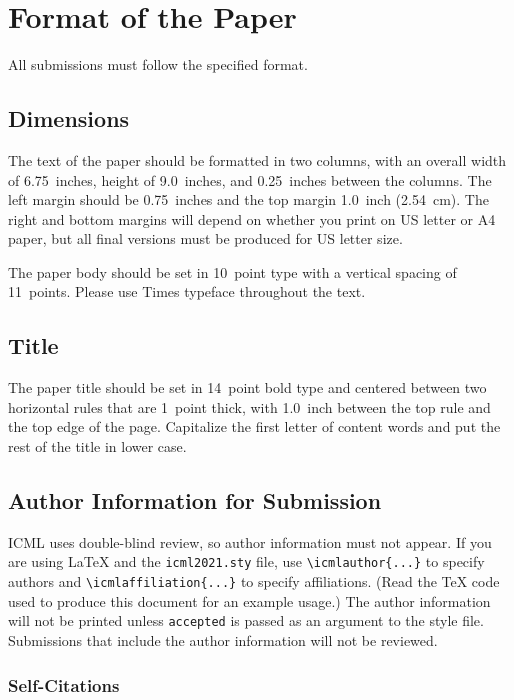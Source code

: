 \section{Format of the Paper}

All submissions must follow the specified format.

\subsection{Dimensions}




The text of the paper should be formatted in two columns, with an
overall width of 6.75~inches, height of 9.0~inches, and 0.25~inches
between the columns. The left margin should be 0.75~inches and the top
margin 1.0~inch (2.54~cm). The right and bottom margins will depend on
whether you print on US letter or A4 paper, but all final versions
must be produced for US letter size.

The paper body should be set in 10~point type with a vertical spacing
of 11~points. Please use Times typeface throughout the text.

\subsection{Title}

The paper title should be set in 14~point bold type and centered
between two horizontal rules that are 1~point thick, with 1.0~inch
between the top rule and the top edge of the page. Capitalize the
first letter of content words and put the rest of the title in lower
case.

\subsection{Author Information for Submission}
\label{author info}

ICML uses double-blind review, so author information must not appear. If
you are using \LaTeX\/ and the \texttt{icml2021.sty} file, use
\verb+\icmlauthor{...}+ to specify authors and \verb+\icmlaffiliation{...}+ to specify affiliations. (Read the TeX code used to produce this document for an example usage.) The author information
will not be printed unless \texttt{accepted} is passed as an argument to the
style file.
Submissions that include the author information will not
be reviewed.

\subsubsection{Self-Citations}

